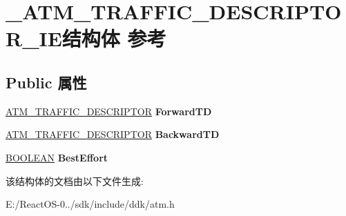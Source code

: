 \hypertarget{struct___a_t_m___t_r_a_f_f_i_c___d_e_s_c_r_i_p_t_o_r___i_e}{}\section{\+\_\+\+A\+T\+M\+\_\+\+T\+R\+A\+F\+F\+I\+C\+\_\+\+D\+E\+S\+C\+R\+I\+P\+T\+O\+R\+\_\+\+I\+E结构体 参考}
\label{struct___a_t_m___t_r_a_f_f_i_c___d_e_s_c_r_i_p_t_o_r___i_e}
\subsection*{Public 属性}
\begin{DoxyCompactItemize}
\item 
\mbox{\label{struct___a_t_m___t_r_a_f_f_i_c___d_e_s_c_r_i_p_t_o_r___i_e_a9f7816348596ca26028c287fa8c21821}} 
\hyperlink{struct___a_t_m___t_r_a_f_f_i_c___d_e_s_c_r_i_p_t_o_r}{A\+T\+M\+\_\+\+T\+R\+A\+F\+F\+I\+C\+\_\+\+D\+E\+S\+C\+R\+I\+P\+T\+OR} {\bfseries Forward\+TD}
\item 
\mbox{\label{struct___a_t_m___t_r_a_f_f_i_c___d_e_s_c_r_i_p_t_o_r___i_e_ab57f9611758d88d7d42e9fe82becc9d8}} 
\hyperlink{struct___a_t_m___t_r_a_f_f_i_c___d_e_s_c_r_i_p_t_o_r}{A\+T\+M\+\_\+\+T\+R\+A\+F\+F\+I\+C\+\_\+\+D\+E\+S\+C\+R\+I\+P\+T\+OR} {\bfseries Backward\+TD}
\item 
\mbox{\label{struct___a_t_m___t_r_a_f_f_i_c___d_e_s_c_r_i_p_t_o_r___i_e_a1ba51f9309a146d95ddb7df83d775531}} 
\hyperlink{_processor_bind_8h_a112e3146cb38b6ee95e64d85842e380a}{B\+O\+O\+L\+E\+AN} {\bfseries Best\+Effort}
\end{DoxyCompactItemize}


该结构体的文档由以下文件生成\+:\begin{DoxyCompactItemize}
\item 
E\+:/\+React\+O\+S-\/0../sdk/include/ddk/atm.\+h\end{DoxyCompactItemize}
